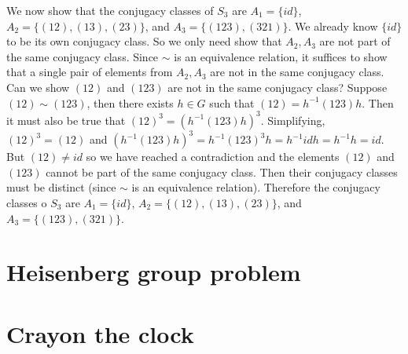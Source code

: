 \documentclass[11pt]{article}
\begin{document}
\begin{exercise}{65}{19}
{        \newpage
        We now show that the conjugacy classes of $S_3$ are $A_1 = \{ id \}$, $A_2 = \{ (12), (13), (23) \}$, and $A_3 = \{ (123), (321) \}$.
        We already know $\{ id \}$ to be its own conjugacy class.
        So we only need show that $A_2, A_3$ are not part of the same conjugacy class.
        Since $\sim$ is an equivalence relation, it suffices to show that a single pair of elements from $A_2, A_3$ are not in the same conjugacy class.
        Can we show $(12)$ and $(123)$ are not in the same conjugacy class?
        Suppose $(12) \sim (123)$, then there exists $h \in G$ such that $(12) = h^{-1} (123) h$.
        Then it must also be true that $(12)^3 = (h^{-1} (123) h)^3$.
        Simplifying, $(12)^3 = (12)$ and $(h^{-1} (123) h)^3 = h^{-1} (123)^3 h = h^{-1} id h = h^{-1} h = id$.
        But $(12) \neq id$ so we have reached a contradiction and the elements $(12)$ and $(123)$ cannot be part of the same conjugacy class.
        Then their conjugacy classes must be distinct (since $\sim$ is an equivalence relation).
        Therefore the conjugacy classes o $S_3$ are $A_1 = \{ id \}$, $A_2 = \{ (12), (13), (23) \}$, and $A_3 = \{ (123), (321) \}$.
    }
\end{exercise}


\begin{exercise}{65}{21}
    \proof{
    }
\end{exercise}


\newpage
\section*{Heisenberg group problem}
    \proof{

    }


\newpage
\section*{Crayon the clock}
    \proof{

    }
\end{document}
